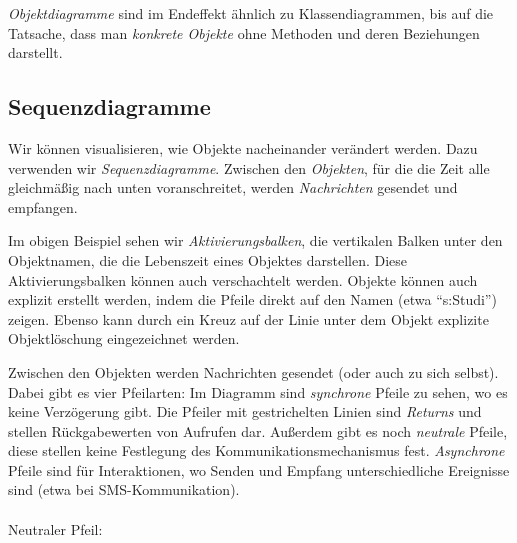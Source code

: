 \documentclass{panikzettel}
\begin{document}
\emph{Objektdiagramme} sind im Endeffekt ähnlich zu Klassendiagrammen, bis auf die Tatsache, dass man \emph{konkrete Objekte} ohne Methoden und deren Beziehungen darstellt.

\subsection{Sequenzdiagramme}
\label{sec:sequenzdiagramme}

Wir können visualisieren, wie Objekte nacheinander verändert werden. Dazu verwenden wir \emph{Sequenzdiagramme}. Zwischen den \emph{Objekten}, für die die Zeit alle gleichmäßig nach unten voranschreitet, werden \emph{Nachrichten} gesendet und empfangen.


Im obigen Beispiel sehen wir \emph{Aktivierungsbalken}, die vertikalen Balken unter den Objektnamen, die die Lebenszeit eines Objektes darstellen. Diese Aktivierungsbalken können auch verschachtelt werden. Objekte können auch explizit erstellt werden, indem die Pfeile direkt auf den Namen (etwa ``s:Studi'') zeigen. Ebenso kann durch ein Kreuz auf der Linie unter dem Objekt explizite Objektlöschung eingezeichnet werden.

Zwischen den Objekten werden Nachrichten gesendet (oder auch zu sich selbst). Dabei gibt es vier Pfeilarten: Im Diagramm sind \emph{synchrone} Pfeile zu sehen, wo es keine Verzögerung gibt. Die Pfeiler mit gestrichelten Linien sind \emph{Returns} und stellen Rückgabewerten von Aufrufen dar. Außerdem gibt es noch \emph{neutrale} Pfeile, diese stellen keine Festlegung des Kommunikationsmechanismus fest. \emph{Asynchrone} Pfeile sind für Interaktionen, wo Senden und Empfang unterschiedliche Ereignisse sind (etwa bei SMS-Kommunikation).
~\\~\\
Neutraler Pfeil: 
\end{document}
